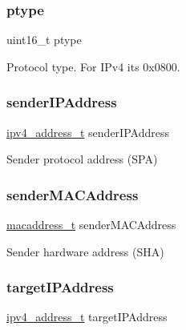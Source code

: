 \subsubsection{\texorpdfstring{ptype}{ptype}}
{\footnotesize\ttfamily uint16\+\_\+t ptype}



Protocol type. For I\+Pv4 it\textquotesingle{}s 0x0800. 

\mbox{\label{struct_a_r_p__message_a9532eb4e3dafc35df5f0cbd0598e6064}} 
\subsubsection{\texorpdfstring{senderIPAddress}{senderIPAddress}}
{\footnotesize\ttfamily \mbox{\hyperlink{group__ipv4_gad9df0882950e70d0587a4b423beb261a}{ipv4\+\_\+address\+\_\+t}} sender\+I\+P\+Address}



Sender protocol address (S\+PA) 

\mbox{\label{struct_a_r_p__message_a493c6c0fac00d24d97c5dd27e448d192}} 
\subsubsection{\texorpdfstring{senderMACAddress}{senderMACAddress}}
{\footnotesize\ttfamily \mbox{\hyperlink{group__ethernet_gacb865bcbf50a6c8cef05581bfabff373}{macaddress\+\_\+t}} sender\+M\+A\+C\+Address}



Sender hardware address (S\+HA) 

\mbox{\label{struct_a_r_p__message_a311d8e70c5a5a8b8b1e613e44ba25639}} 
\subsubsection{\texorpdfstring{targetIPAddress}{targetIPAddress}}
{\footnotesize\ttfamily \mbox{\hyperlink{group__ipv4_gad9df0882950e70d0587a4b423beb261a}{ipv4\+\_\+address\+\_\+t}} target\+I\+P\+Address}



